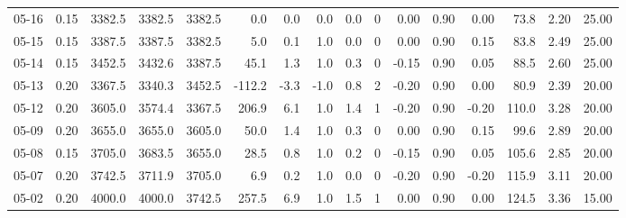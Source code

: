 \begin{threeparttable}
{\begin{tabular}{lrrrrrrrrrrrrrrr}
  05-16 &     0.15 & 3382.5 & 3382.5 & 3382.5 &        0.0 &            0.0 &                      0.0 &                 0.0 &              0 &       0.00 &      0.90 &           0.00 &             73.8 &            2.20 &                  25.00 \\
  05-15 &     0.15 & 3387.5 & 3387.5 & 3382.5 &        5.0 &            0.1 &                      1.0 &                 0.0 &              0 &       0.00 &      0.90 &           0.15 &             83.8 &            2.49 &                  25.00 \\
  05-14 &     0.15 & 3452.5 & 3432.6 & 3387.5 &       45.1 &            1.3 &                      1.0 &                 0.3 &              0 &      -0.15 &      0.90 &           0.05 &             88.5 &            2.60 &                  25.00 \\
  05-13 &     0.20 & 3367.5 & 3340.3 & 3452.5 &     -112.2 &           -3.3 &                     -1.0 &                 0.8 &              2 &      -0.20 &      0.90 &           0.00 &             80.9 &            2.39 &                  20.00 \\
  05-12 &     0.20 & 3605.0 & 3574.4 & 3367.5 &      206.9 &            6.1 &                      1.0 &                 1.4 &              1 &      -0.20 &      0.90 &          -0.20 &            110.0 &            3.28 &                  20.00 \\
  05-09 &     0.20 & 3655.0 & 3655.0 & 3605.0 &       50.0 &            1.4 &                      1.0 &                 0.3 &              0 &       0.00 &      0.90 &           0.15 &             99.6 &            2.89 &                  20.00 \\
  05-08 &     0.15 & 3705.0 & 3683.5 & 3655.0 &       28.5 &            0.8 &                      1.0 &                 0.2 &              0 &      -0.15 &      0.90 &           0.05 &            105.6 &            2.85 &                  20.00 \\
  05-07 &     0.20 & 3742.5 & 3711.9 & 3705.0 &        6.9 &            0.2 &                      1.0 &                 0.0 &              0 &      -0.20 &      0.90 &          -0.20 &            115.9 &            3.11 &                  20.00 \\
  05-02 &     0.20 & 4000.0 & 4000.0 & 3742.5 &      257.5 &            6.9 &                      1.0 &                 1.5 &              1 &       0.00 &      0.90 &           0.00 &            124.5 &            3.36 &                  15.00 \\

\end{tabular}}
\end{threeparttable}
